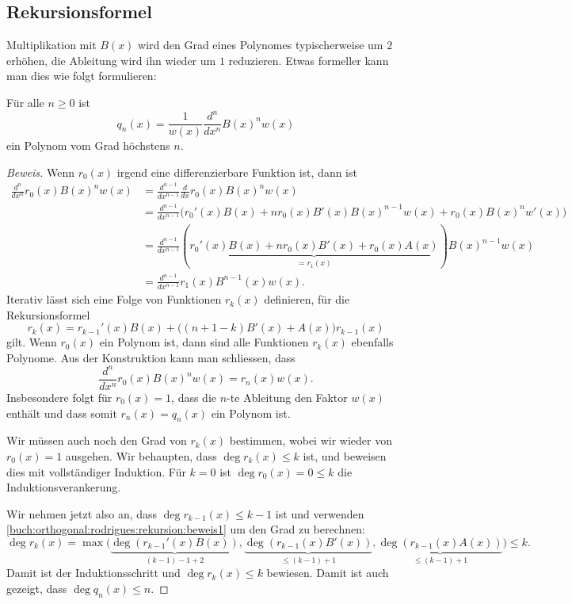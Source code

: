 %
%
\subsection{Rekursionsformel}
Multiplikation mit $B(x)$ wird den Grad eines Polynomes typischerweise 
um $2$ erhöhen, die Ableitung wird ihn wieder um $1$ reduzieren.
Etwas formeller kann man dies wie folgt formulieren:

\begin{satz}
Für alle $n\ge 0$ ist
\begin{equation}
q_n(x)
=
\frac{1}{w(x)}
\frac{d^n}{dx^n} B(x)^n w(x)
\label{buch:orthogonalitaet:rodrigues:eqn:rekursion}
\end{equation}
ein Polynom vom Grad höchstens $n$.
\end{satz}

\begin{proof}[Beweis]
Wenn $r_0(x)$ irgend eine differenzierbare Funktion ist, dann ist
\begin{align*}
\frac{d^n}{dx^n}
r_0(x) B(x)^n w(x)
&=
\frac{d^{n-1}}{dx^{n-1}}\frac{d}{dx} r_0(x) B(x)^n w(x)
\\
&=
\frac{d^{n-1}}{dx^{n-1}}
\bigl(r_0'(x)B(x)+ nr_0(x)B'(x)B(x)^{n-1}w(x) + r_0(x)B(x)^n w'(x) \bigr)
\\
&=
\frac{d^{n-1}}{dx^{n-1}}
(\underbrace{r_0'(x)B(x)+nr_0(x)B'(x)+r_0(x)A(x)}_{\displaystyle = r_1(x)})
B(x)^{n-1} w(x)
\\
&=
\frac{d^{n-1}}{dx^{n-1}} r_1(x)B^{n-1}(x) w(x).
\end{align*}
Iterativ lässt sich eine Folge von
Funktionen $r_k(x)$ definieren, für die Rekursionsformel
\begin{equation}
r_k(x) = r_{k-1}'(x)B(x) + \bigl((n+1-k)B'(x) + A(x)\bigr)r_{k-1}(x)
\label{buch:orthogonal:rodrigues:rekursion:beweis1}
\end{equation}
gilt.
Wenn $r_0(x)$ ein Polynom ist, dann sind alle Funktionen $r_k(x)$
ebenfalls Polynome.
Aus der Konstruktion kann man schliessen, dass
\[
\frac{d^n}{dx^n} r_0(x) B(x)^n w(x)
=
r_n(x) w(x).
\]
Insbesondere folgt für $r_0(x)=1$, dass die $n$-te Ableitung den
Faktor $w(x)$ enthält und dass somit $r_n(x)=q_n(x)$ ein Polynom ist.

Wir müssen auch noch den Grad von $r_k(x)$ bestimmen, wobei wir
wieder von $r_0(x)=1$ ausgehen.
Wir behaupten, dass $\deg r_k(x)\le k$ ist, und beweisen dies
mit vollständiger Induktion.
Für $k=0$ ist $\deg r_0(x) = 0 \le k$ die Induktionsverankerung.

Wir nehmen jetzt also an, dass $\deg r_{k-1}(x)\le k-1$ ist und
verwenden 
\eqref{buch:orthogonal:rodrigues:rekursion:beweis1} um den Grad zu berechnen:
\begin{equation*}
\deg r_k(x)
=
\max \bigl(
\underbrace{\deg(r_{k-1}'(x) B(x))}_{\displaystyle (k-1) -1 + 2}
,
\underbrace{\deg(r_{k-1}(x)B'(x))}_{\displaystyle \le (k-1)+1}
,
\underbrace{\deg(r_{k-1}(x)A(x))}_{\displaystyle \le (k-1)+1}
\bigr)
\le k.
\end{equation*}
Damit ist der Induktionsschritt und $\deg r_k(x)\le k$ bewiesen.
Damit ist auch gezeigt, dass $\deg q_n(x)\le n$.
\end{proof}

